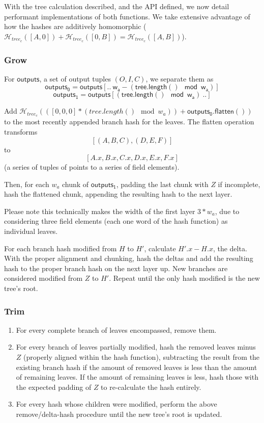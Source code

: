 \documentclass[]{article}
\begin{document}
With the tree calculation described, and the API defined, we now detail performant implementations of both functions. We take extensive advantage of how the hashes are additively homomorphic ($\mathcal{H}_{tree_c}([A, 0]) + \mathcal{H}_{tree_c}([0, B]) = \mathcal{H}_{tree_c}([A, B])$).

\subsubsection{Grow}

For $\mathsf{outputs}$, a set of output tuples $(O, I, C)$, we separate them as
$$
\mathsf{outputs_0} = \mathsf{outputs[.. ~w_a - (tree.length() \mod w_a)]}
$$
$$
\mathsf{outputs_1} = \mathsf{outputs[(tree.length() \mod w_a) ~..]}
$$

Add $\mathcal{H}_{tree_c}(([0, 0, 0] * (tree.length() \mod w_a)) + \mathsf{outputs_0.flatten()})$ to the most recently appended branch hash for the leaves. The flatten operation transforms $$[(A, B, C), (D, E, F)]$$ to $$[
A.x, B.x, C.x,
D.x, E.x, F.x
]$$
(a series of tuples of points to a series of field elements).

Then, for each $w_a$ chunk of $\mathsf{outputs_1}$, padding the last chunk with $Z$ if incomplete, hash the flattened chunk, appending the resulting hash to the next layer.

Please note this technically makes the width of the first layer $3 * w_a$, due to considering three field elements (each one word of the hash function) as individual leaves.

For each branch hash modified from $H$ to $H'$, calculate $H'.x - H.x$, the delta. With the proper alignment and chunking, hash the deltas and add the resulting hash to the proper branch hash on the next layer up. New branches are considered modified from $Z$ to $H'$. Repeat until the only hash modified is the new tree's root.

\subsubsection{Trim}

\begin{enumerate}
  \item For every complete branch of leaves encompassed, remove them.
  \item For every branch of leaves partially modified, hash the removed leaves minus $Z$ (properly aligned within the hash function), subtracting the result from the existing branch hash if the amount of removed leaves is less than the amount of remaining leaves. If the amount of remaining leaves is less, hash those with the expected padding of $Z$ to re-calculate the hash entirely.
  \item For every hash whose children were modified, perform the above remove/delta-hash procedure until the new tree's root is updated.
\end{enumerate}
\end{document}
